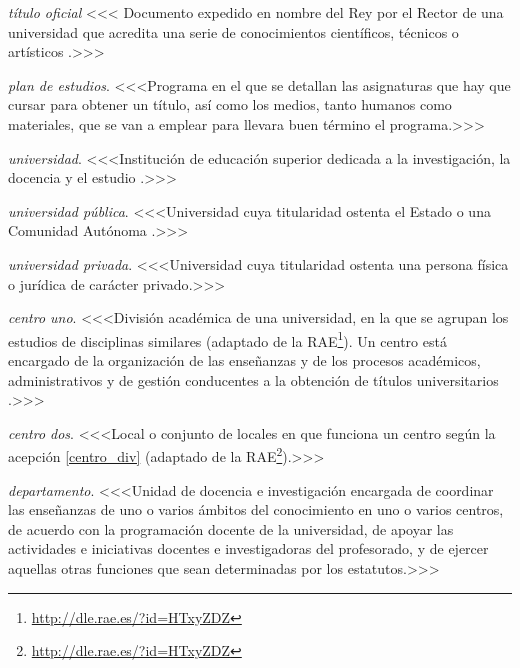     \item \emph{título oficial} <<<\label{def_titulo_documento} Documento expedido en nombre del Rey por el Rector de una universidad \cite[artículo 35]{leyUniversidades} que acredita una serie de conocimientos científicos, técnicos o artísticos \cite[artículo 33]{leyUniversidades}.>>>

    \item \emph{plan de estudios}. <<<Programa en el que se detallan las asignaturas que hay que cursar para obtener un título, así como los medios, tanto humanos como materiales, que se van a emplear para llevara buen término el programa.>>>

    \item \emph{universidad}. <<<Institución de educación superior dedicada a la investigación, la docencia y el estudio \cite[articulo 1, apartado 1]{leyUniversidades}.>>>

    \item \emph{universidad pública}. <<<Universidad cuya titularidad ostenta el Estado o una Comunidad Autónoma \cite[artículo 3]{rdUniversidadesPrivadas}.>>>

    \item \emph{universidad privada}. <<<Universidad cuya titularidad ostenta una persona física o jurídica de carácter privado\cite[artículo 3]{rdUniversidadesPrivadas}.>>>

    \item \emph{centro uno}. <<<División académica de una universidad, en la que se agrupan los estudios de disciplinas similares (adaptado de la RAE\footnote{\url{http://dle.rae.es/?id=HTxyZDZ}}). Un centro está encargado de la organización de las enseñanzas y de los procesos académicos, administrativos y de gestión conducentes a la obtención de títulos universitarios \cite[artículo 8]{leyUniversidades}.>>>

     \item \emph{centro dos}. <<<Local o conjunto de locales en que funciona un centro según la acepción \ref{centro_div} (adaptado de la RAE\footnote{\url{http://dle.rae.es/?id=HTxyZDZ}}).>>>

    \item \emph{departamento}. <<<Unidad de docencia e investigación encargada de coordinar las enseñanzas de uno o varios ámbitos del conocimiento en uno o varios centros, de acuerdo con la programación docente de la universidad, de apoyar las actividades e iniciativas docentes e investigadoras del profesorado, y de ejercer aquellas otras funciones que sean determinadas por los estatutos\cite[artículo 9]{leyUniversidades}.>>>

